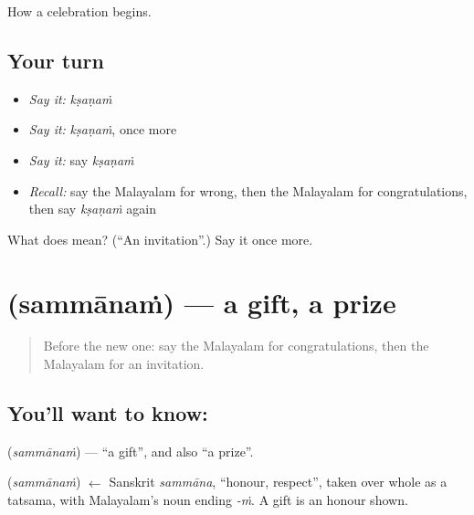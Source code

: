\begin{grammarlens}[title={What you've built}]
How a celebration begins.
\end{grammarlens}

\subsection*{Your turn}
\begin{itemize}
\raggedright
  \item \emph{Say it:} \emph{kṣaṇaṁ}
  \item \emph{Say it:} \emph{kṣaṇaṁ}, once more
  \item \emph{Say it:} say \emph{kṣaṇaṁ}
  \item \emph{Recall:} say the Malayalam for wrong, then the Malayalam for congratulations, then say \emph{kṣaṇaṁ} again
\end{itemize}

\begin{tcolorbox}[breakable,colback=teal!4,colframe=teal!35!black,title={Before you move on}]
What does  mean? (\textquotedblleft{}An invitation\textquotedblright{}.) Say it once more.
\end{tcolorbox}
\section[\texorpdfstring{\ml{സമ്മാനം} (sammānaṁ)}{സമ്മാനം (sammānaṁ)}]{ (sammānaṁ) — a gift, a prize}

\label{lesson:ML-C124-gift}



\begin{quote}
Before the new one: say the Malayalam for congratulations, then the Malayalam for an invitation.
\end{quote}

\subsection*{You'll want to know: }
\textbf{} (\emph{sammānaṁ}) — \textquotedblleft{}a gift\textquotedblright{}, and also \textquotedblleft{}a prize\textquotedblright{}.

\begin{cousinweb}
\textbf{} (\emph{sammānaṁ}) $\leftarrow$ Sanskrit \emph{sammāna}, \textquotedblleft{}honour, respect\textquotedblright{}, taken over whole as a tatsama, with Malayalam's noun ending \emph{-ṁ}. A gift is an honour shown.
\end{cousinweb}

